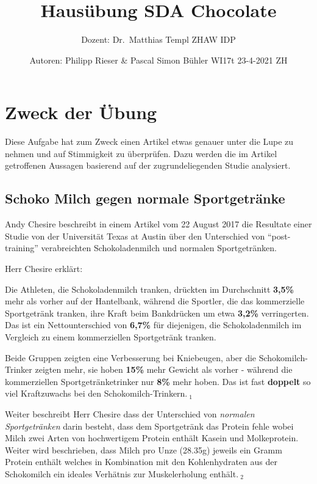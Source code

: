 \documentclass[
]{article}
\title{Hausübung SDA Chocolate}
\author{Dozent: Dr.~Matthias Templ ZHAW IDP}
\date{Autoren: Philipp Rieser \& Pascal Simon Bühler WI17t 23-4-2021 ZH}
\begin{document}
\maketitle

\captionsetup[figure]{name=Abbildung}
\captionsetup[table]{name=Tabelle}

\hypertarget{zweck-der-uxfcbung}{%
\section{Zweck der Übung}\label{zweck-der-uxfcbung}}

Diese Aufgabe hat zum Zweck einen Artikel etwas genauer unter die Lupe
zu nehmen und auf Stimmigkeit zu überprüfen. Dazu werden die im Artikel
getroffenen Aussagen basierend auf der zugrundeliegenden Studie
analysiert.

\hypertarget{schoko-milch-gegen-normale-sportgetruxe4nke}{%
\subsection{Schoko Milch gegen normale
Sportgetränke}\label{schoko-milch-gegen-normale-sportgetruxe4nke}}

Andy Chesire beschreibt in einem Artikel vom 22 August 2017 die
Resultate einer Studie von der Universität Texas at Austin über den
Unterschied von ``post-training'' verabreichten Schokoladenmilch und
normalen Sportgetränken.

Herr Chesire erklärt:

Die Athleten, die Schokoladenmilch tranken, drückten im Durchschnitt
\textbf{3,5\%} mehr als vorher auf der Hantelbank, während die Sportler,
die das kommerzielle Sportgetränk tranken, ihre Kraft beim Bankdrücken
um etwa \textbf{3,2\%} verringerten. Das ist ein Nettounterschied von
\textbf{6,7\%} für diejenigen, die Schokoladenmilch im Vergleich zu
einem kommerziellen Sportgetränk tranken.

Beide Gruppen zeigten eine Verbesserung bei Kniebeugen, aber die
Schokomilch-Trinker zeigten mehr, sie hoben \textbf{15\%} mehr Gewicht
als vorher - während die kommerziellen Sportgetränketrinker nur
\textbf{8\%} mehr hoben. Das ist fast \textbf{doppelt} so viel
Kraftzuwachs bei den Schokomilch-Trinkern.\(\ _{1}\)

Weiter beschreibt Herr Chesire dass der Unterschied von \emph{normalen
Sportgetränken} darin besteht, dass dem Sportgetränk das Protein fehle
wobei Milch zwei Arten von hochwertigem Protein enthält Kasein und
Molkeprotein. Weiter wird beschrieben, dass Milch pro Unze (28.35g)
jeweils ein Gramm Protein enthält welches in Kombination mit den
Kohlenhydraten aus der Schokomilch ein ideales Verhätnis zur
Muskelerholung enthält.\(\ _{2}\)
\end{document}
